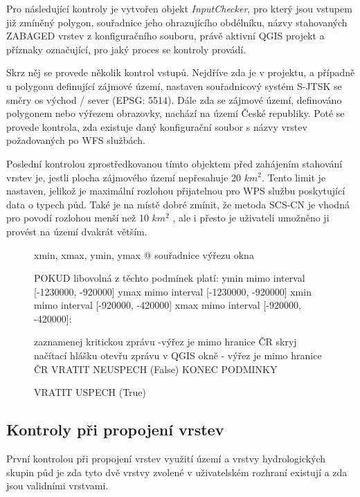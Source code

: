 \documentclass[a4paper,oneside,12pt]{book}
\begin{document}
\hspace{10mm} Pro následující kontroly je vytvořen objekt \textit{InputChecker}, pro který jsou vstupem již zmíněný polygon, souřadnice jeho ohrazujícího obdélníku, názvy stahovaných ZABAGED vrstev z konfiguračního souboru, právě aktivní QGIS projekt a příznaky označující, pro jaký proces se kontroly provádí.

\hspace{10mm} Skrz něj se provede několik kontrol vstupů. Nejdříve zda je v projektu, a případně u polygonu definující zájmové území, nastaven souřadnicový systém S-JTSK se směry os východ / sever (EPSG: 5514). Dále zda se zájmové území, definováno polygonem nebo výřezem obrazovky, nachází na území České republiky. Poté se provede kontrola,  zda existuje daný konfigurační soubor s názvy vrstev požadovaných po WFS službách. 

\hspace{10mm} Poslední kontrolou zprostředkovanou tímto objektem před zahájením stahování vrstev je, jestli plocha zájmového území nepřesahuje 20 $km^{2}$. Tento limit je nastaven, jelikož je maximální rozlohou přijatelnou pro WPS službu poskytující data o typech půd. Také je na místě dobré zmínit, že metoda SCS-CN je vhodná pro povodí rozlohou menší než 10 $km^{2}$ \cite{Pasak1983}, ale i přesto je uživateli umožněno ji provést na území dvakrát větším.

\begin{figure}[H]
\begin{pseudocode}[style=mypseudocode, caption={Ukázka kontroly umístění zájmového území v ČR},label={kod:CR_check}]
    xmin, xmax, ymin, ymax @ souřadnice výřezu okna
    
    POKUD libovolná z těchto podmínek platí:
         ymin mimo interval [-1230000, -920000]  
         ymax mimo interval [-1230000, -920000]  
         xmin mimo interval [-920000, -420000]  
         xmax mimo interval [-920000, -420000]:
            
            zaznamenej kritickou zprávu -výřez je mimo hranice ČR
            skryj načítací hlášku
            otevřu zprávu v QGIS okně - výřez je mimo hranice ČR
            VRATIT NEUSPECH (False)
    KONEC PODMINKY
    
    VRATIT USPECH (True)
\end{pseudocode}
\end{figure}
\subsection{Kontroly při propojení vrstev} \label{intersection_checks}
\hspace{10mm}  První kontrolou při propojení vrstev využití území a vrstvy hydrologických skupin půd je zda tyto dvě vrstvy zvolené v uživatelském rozhraní existují a zda jsou validními vrstvami.
\end{document}
